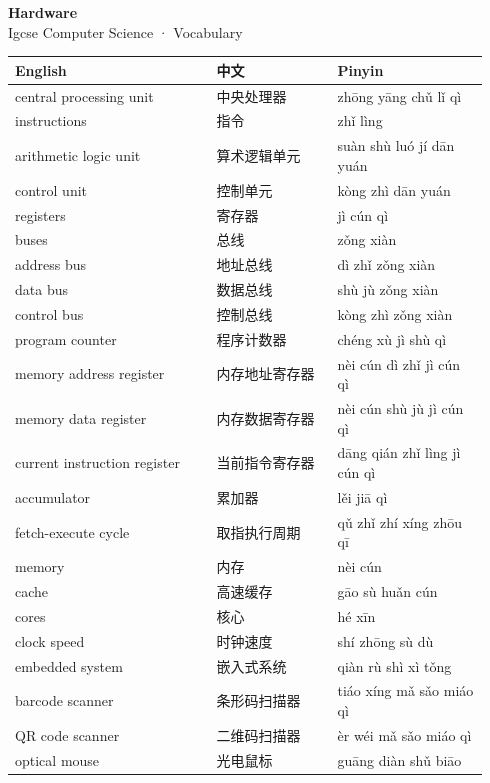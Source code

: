 \documentclass[11pt]{article}
\begin{document}
\begin{center}
  {\LARGE\bfseries Hardware}\\[0.35em]
  {\large Igcse Computer Science · Vocabulary}
\end{center}
\vspace{0.6em}

\begin{longtable}{@{}p{0.40\linewidth}p{0.24\linewidth}p{0.30\linewidth}@{}}
\toprule
\textbf{English} & \textbf{中文} & \textbf{Pinyin} \\
\midrule
\endhead
\bottomrule
\endlastfoot
central processing unit & 中央处理器 & zhōng yāng chǔ lǐ qì \\
instructions & 指令 & zhǐ lìng \\
arithmetic logic unit & 算术逻辑单元 & suàn shù luó jí dān yuán \\
control unit & 控制单元 & kòng zhì dān yuán \\
registers & 寄存器 & jì cún qì \\
buses & 总线 & zǒng xiàn \\
address bus & 地址总线 & dì zhǐ zǒng xiàn \\
data bus & 数据总线 & shù jù zǒng xiàn \\
control bus & 控制总线 & kòng zhì zǒng xiàn \\
program counter & 程序计数器 & chéng xù jì shù qì \\
memory address register & 内存地址寄存器 & nèi cún dì zhǐ jì cún qì \\
memory data register & 内存数据寄存器 & nèi cún shù jù jì cún qì \\
current instruction register & 当前指令寄存器 & dāng qián zhǐ lìng jì cún qì \\
accumulator & 累加器 & lěi jiā qì \\
fetch-execute cycle & 取指执行周期 & qǔ zhǐ zhí xíng zhōu qī \\
memory & 内存 & nèi cún \\
cache & 高速缓存 & gāo sù huǎn cún \\
cores & 核心 & hé xīn \\
clock speed & 时钟速度 & shí zhōng sù dù \\
embedded system & 嵌入式系统 & qiàn rù shì xì tǒng \\
barcode scanner & 条形码扫描器 & tiáo xíng mǎ sǎo miáo qì \\
QR code scanner & 二维码扫描器 & èr wéi mǎ sǎo miáo qì \\
optical mouse & 光电鼠标 & guāng diàn shǔ biāo \\

\end{longtable}
\end{document}
